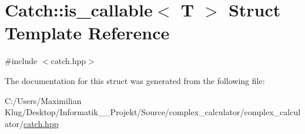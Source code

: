 \hypertarget{struct_catch_1_1is__callable}{}\section{Catch\+:\+:is\+\_\+callable$<$ T $>$ Struct Template Reference}
\label{struct_catch_1_1is__callable}


{\ttfamily \#include $<$catch.\+hpp$>$}



The documentation for this struct was generated from the following file\+:\begin{DoxyCompactItemize}
\item 
C\+:/\+Users/\+Maximilian Klug/\+Desktop/\+Informatik\+\_\+\_\+\+Projekt/\+Source/complex\+\_\+calculator/complex\+\_\+calculator/\mbox{\hyperlink{catch_8hpp}{catch.\+hpp}}\end{DoxyCompactItemize}
